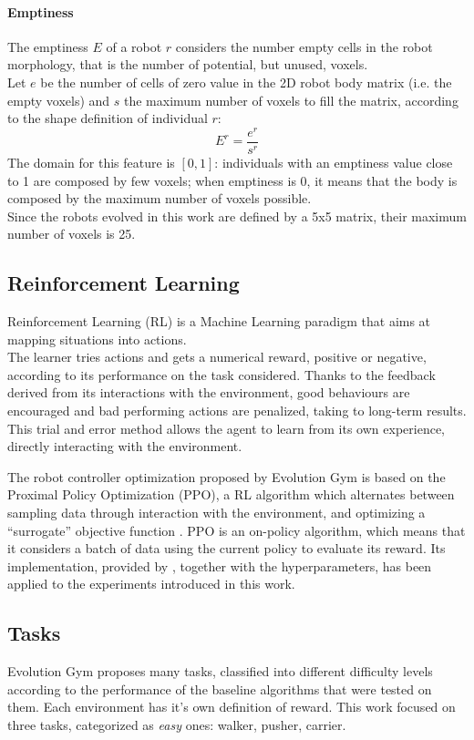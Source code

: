 \paragraph{Emptiness}
The emptiness $E$ of a robot $r$ considers the number empty cells in the robot morphology, that is the number of potential, but unused, voxels.\\
Let $e$ be the number of cells of zero value in the 2D robot body matrix (i.e. the empty voxels) and $s$ the maximum number of voxels to fill the matrix, according to the shape definition of individual $r$: 
\[E^r = \dfrac{e^r}{s^r}\]
The domain for this feature is $[0, 1]$: individuals with an emptiness value close to 1 are composed by few voxels; when emptiness is 0, it means that the body is composed by the maximum number of voxels possible.\\
Since the robots evolved in this work are defined by a 5x5 matrix, their maximum number of voxels is 25.


\subsection{Reinforcement Learning}
Reinforcement Learning (RL) is a Machine Learning paradigm that aims at mapping situations into actions.\\
The learner tries actions and gets a numerical reward, positive or negative, according to its performance on the task considered.
Thanks to the feedback derived from its interactions with the environment, good behaviours are encouraged and bad performing actions are penalized, taking to long-term results.
This trial and error method allows the agent to learn from its own experience, directly interacting with the environment.

The robot controller optimization proposed by Evolution Gym is based on the Proximal Policy Optimization (PPO), a RL algorithm which alternates between sampling data through interaction with the environment, and optimizing a “surrogate” objective function \cite{schulman2017proximal}.
PPO is an on-policy algorithm, which means that it considers a batch of data using the current policy to evaluate its reward.
Its implementation, provided by \cite{kostrikov2018}, together with the hyperparameters, has been applied to the experiments introduced in this work.


\subsection{Tasks}
Evolution Gym proposes many tasks, classified into different difficulty levels according to the performance of the baseline algorithms that were tested on them. Each environment has it's own definition of reward.
This work focused on three tasks, categorized as \textit{easy} ones: walker, pusher, carrier.

